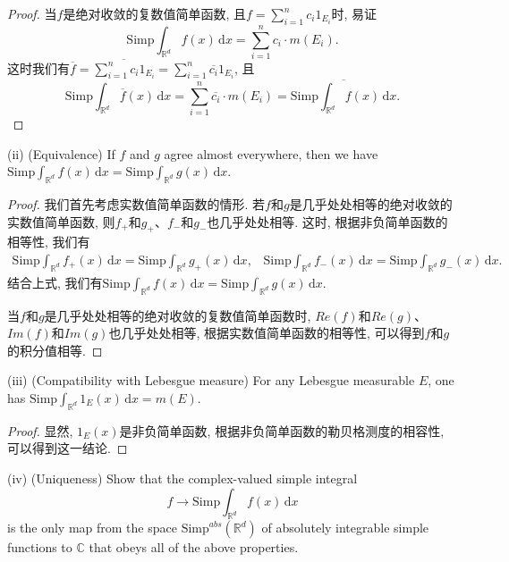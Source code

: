 \documentclass[reqno,a4paper,10pt]{amsart}
\newcommand\dif{\,\mathrm{d}}
\begin{document}
\begin{proof}
    当$f$是绝对收敛的复数值简单函数, 且$f=\sum_{i=1}^n c_i 1_{E_i}$时, 易证
    \begin{equation}
        \mathrm{Simp}\int_{\mathbb{R}^d}  f(x)\dif x = \sum_{i=1}^n c_i \cdot m(E_i).
        \label{Uniqueness}
    \end{equation}
    这时我们有$\overline{f}=\overline{\sum_{i=1}^nc_i 1_{E_i}}=\sum_{i=1}^n \overline{c_i}1_{E_i}$, 且
    \begin{equation*}
        \mathrm{Simp} \int_{\mathbb{R}^d} \overline{f}(x)\dif x = \sum_{i=1}^n \overline{c_i}\cdot m(E_i)=\overline{\mathrm{Simp}\int_{\mathbb{R}^d} f(x)\dif x}.
    \end{equation*}
\end{proof}
(ii) (Equivalence) If $f$ and $g$ agree almost everywhere, then we have \\$\mathrm{Simp}\int_{\mathbb{R}^d} f(x)\dif x=\mathrm{Simp}\int_{\mathbb{R}^d} g(x)\dif x$.
\begin{proof}
    我们首先考虑实数值简单函数的情形. 若$f$和$g$是几乎处处相等的绝对收敛的实数值简单函数, 则$f_+$和$g_+$、$f_-$和$g_-$也几乎处处相等. 这时, 根据非负简单函数的相等性, 我们有
    \begin{equation*}
        \begin{split}
            \mathrm{Simp}\int_{\mathbb{R}^d} f_+(x)\dif x = \mathrm{Simp}\int_{\mathbb{R}^d} g_+(x)\dif x,\;\;\;\mathrm{Simp}\int_{\mathbb{R}^d} f_-(x)\dif x = \mathrm{Simp}\int_{\mathbb{R}^d} g_-(x)\dif x.
        \end{split}
    \end{equation*}
    结合上式, 我们有$\mathrm{Simp}\int_{\mathbb{R}^d} f(x)\dif x=\mathrm{Simp}\int_{\mathbb{R}^d} g(x)\dif x$. 
    
    当$f$和$g$是几乎处处相等的绝对收敛的复数值简单函数时, $Re(f)$和$Re(g)$、$Im(f)$和$Im(g)$也几乎处处相等, 根据实数值简单函数的相等性, 可以得到$f$和$g$的积分值相等. 
\end{proof}
(iii) (Compatibility with Lebesgue measure) For any Lebesgue measurable $E$, one has $\mathrm{Simp} \int_{\mathbb{R}^d} 1_{E}(x)\dif x=m(E)$.
\begin{proof}
    显然, $1_{E}(x)$是非负简单函数, 根据非负简单函数的勒贝格测度的相容性, 可以得到这一结论. 
\end{proof}
(iv) (Uniqueness) Show that the complex-valued simple integral 
\begin{equation*}
    f \to \mathrm{Simp} \int_{\mathbb{R}^d} f(x) \dif x
\end{equation*}
is the only map from the space $\mathrm{Simp}^{abs}(\mathbb{R}^d)$ of absolutely integrable simple functions to $\mathbb{C}$ that obeys all of the above properties.
\end{document}
